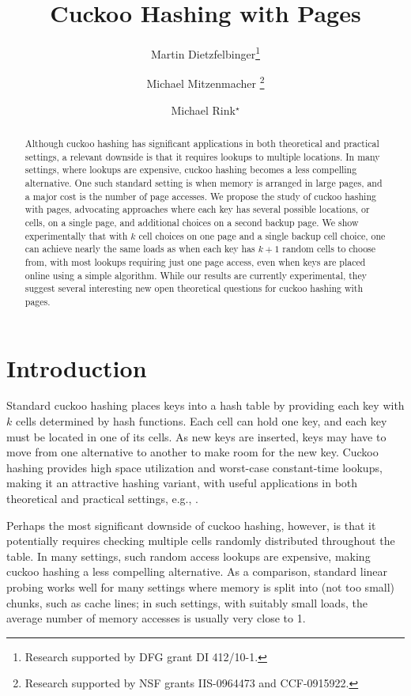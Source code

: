 \let\accentvec\vec \documentclass{llncs}
\author{Martin Dietzfelbinger\inst{1}\thanks{Research supported by DFG grant DI 412/10-1.}
\and Michael Mitzenmacher \inst{2}\thanks{Research supported by NSF grants IIS-0964473 and CCF-0915922.}
\and Michael Rink\inst{1}${}^\star$
}
\institute{Fakult\"at f\"ur Informatik und Automatisierung, Technische Universit\"at Ilmenau
\email{\{martin.dietzfelbinger,michael.rink\}@tu-ilmenau.de}
\and School of Engineering and Applied Sciences, Harvard University
\email{michaelm@eecs.harvard.edu}
}
\title{Cuckoo Hashing with Pages}
\newcommand{\eg}{e.g.}
\begin{document}
\maketitle
\begin{abstract}  
Although cuckoo hashing has significant applications in both
theoretical and practical settings, a relevant downside is that it
requires lookups to multiple locations.  In many settings, where
lookups are expensive, cuckoo hashing becomes a less compelling
alternative.  One such standard setting is when memory is arranged in
large pages, and a major cost is the number of page accesses.  We
propose the study of cuckoo hashing with pages, advocating approaches
where each key has several possible locations, or cells, on a single
page, and additional choices on a second backup page.  We show
experimentally that with $k$ cell choices on one page and a single
backup cell choice, one can achieve nearly the same loads as when each
key has $k+1$ random cells to choose from, with most lookups requiring
just one page access, even when keys are placed online using 
a simple algorithm.  While our results are currently
experimental, they suggest several interesting new open theoretical
questions for cuckoo hashing with pages.
\end{abstract}  
\section{Introduction}
Standard cuckoo hashing places keys into a hash table by providing
each key with $k$ cells determined by hash functions.  Each cell can
hold one key, and each key must be located in one of its cells.  As
new keys are inserted, keys may have to move from one alternative to
another to make room for the new key. Cuckoo hashing provides high
space utilization and worst-case constant-time lookups, making it an
attractive hashing variant, with useful applications in both
theoretical and practical settings, \eg, \cite{alcantara2009real,erlingsson2006cool,FotakisPSS2005,PaghR2004,ross2007efficient}.  

Perhaps the most significant downside of cuckoo hashing, however, is
that it potentially requires checking multiple cells randomly
distributed throughout the table.  In many settings, such random
access lookups are expensive, making cuckoo hashing a less compelling
alternative.  As a comparison, standard linear probing works
well for many settings where memory is split into (not too small)
chunks, such as cache lines; in such settings, with suitably small
loads, the average number of memory accesses is usually very close to
1.
\end{document}
